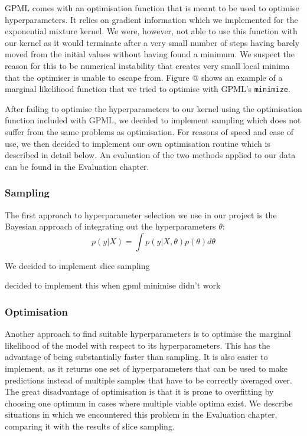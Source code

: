 \documentclass[a4paper,12pt,twoside,openright]{report}
\begin{document}
GPML comes with an optimisation function that is meant to be used to optimise hyperparameters. It relies on gradient information which we implemented for the exponential mixture kernel. We were, however, not able to use this function with our kernel as it would terminate after a very small number of steps having barely moved from the initial values without having found a minimum. We suspect the reason for this to be numerical instability that creates very small local minima that the optimiser is unable to escape from. Figure @ shows an example of a marginal likelihood function that we tried to optimise with GPML's \texttt{minimize}.

After failing to optimise the hyperparameters to our kernel using the optimisation function included with GPML, we decided to implement sampling which does not suffer from the same problems as optimisation. For reasons of speed and ease of use, we then decided to implement our own optimisation routine which is described in detail below. An evaluation of the two methods applied to our data can be found in the Evaluation chapter.


\subsubsection{Sampling}
The first approach to hyperparameter selection we use in our project is the Bayesian approach of integrating out the hyperparameters $\theta$:
\begin{equation}
p(y|X) = \int p(y|X,\theta)p(\theta)d\theta
\end{equation}


We decided to implement slice sampling

decided to implement this when gpml minimise didn't work







\subsubsection{Optimisation}
Another approach to find suitable hyperparameters is to optimise the marginal likelihood of the model with respect to its hyperparameters. This has the advantage of being substantially faster than sampling. It is also easier to implement, as it returns one set of hyperparameters that can be used to make predictions instead of multiple samples that have to be correctly averaged over. The great disadvantage of optimisation is that it is prone to overfitting by choosing one optimum in cases where multiple viable optima exist. We describe situations in which we encountered this problem in the Evaluation chapter, comparing it with the results of slice sampling.
\end{document}
